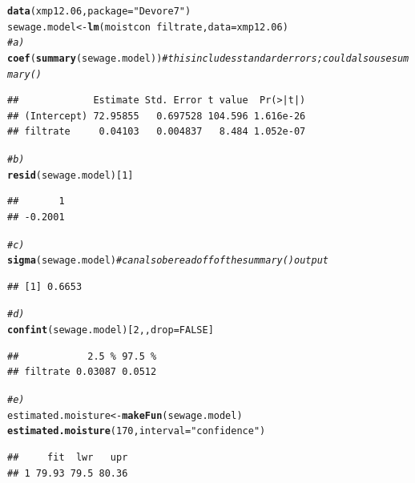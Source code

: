 \documentclass[twoside]{book}\usepackage[]{graphicx}\usepackage[]{xcolor}
\makeatletter
\newcommand{\hlnum}[1]{\textcolor[rgb]{0.686,0.059,0.569}{#1}}%
\newcommand{\hlstr}[1]{\textcolor[rgb]{0.192,0.494,0.8}{#1}}%
\newcommand{\hlcom}[1]{\textcolor[rgb]{0.678,0.584,0.686}{\textit{#1}}}%
\newcommand{\hlopt}[1]{\textcolor[rgb]{0,0,0}{#1}}%
\newcommand{\hlstd}[1]{\textcolor[rgb]{0.345,0.345,0.345}{#1}}%
\newcommand{\hlkwb}[1]{\textcolor[rgb]{0.69,0.353,0.396}{#1}}%
\newcommand{\hlkwc}[1]{\textcolor[rgb]{0.333,0.667,0.333}{#1}}%
\newcommand{\hlkwd}[1]{\textcolor[rgb]{0.737,0.353,0.396}{\textbf{#1}}}%
\newenvironment{kframe}{%
 \def\at@end@of@kframe{}%
 \ifinner\ifhmode%
  \def\at@end@of@kframe{\end{minipage}}%
  \begin{minipage}{\columnwidth}%
 \fi\fi%
 \def\FrameCommand##1{\hskip\@totalleftmargin \hskip-\fboxsep
 \colorbox{shadecolor}{##1}\hskip-\fboxsep
     \hskip-\linewidth \hskip-\@totalleftmargin \hskip\columnwidth}%
 \MakeFramed {\advance\hsize-\width
   \@totalleftmargin\z@ \linewidth\hsize
   \@setminipage}}%
 {\par\unskip\endMakeFramed%
 \at@end@of@kframe}
\newenvironment{knitrout}{}{} %
\makeatother
\begin{document}
\begin{solution}
\begin{knitrout}
\color{fgcolor}\begin{kframe}
\begin{alltt}
\hlkwd{data}\hlstd{(xmp12.06,} \hlkwc{package} \hlstd{=} \hlstr{"Devore7"}\hlstd{)}
\hlstd{sewage.model} \hlkwb{<-} \hlkwd{lm}\hlstd{(moistcon} \hlopt{~} \hlstd{filtrate,} \hlkwc{data} \hlstd{= xmp12.06)}
\hlcom{# a)}
\hlkwd{coef}\hlstd{(}\hlkwd{summary}\hlstd{(sewage.model))}  \hlcom{# this includes standard errors; could also use summary() }
\end{alltt}
\begin{verbatim}
##             Estimate Std. Error t value  Pr(>|t|)
## (Intercept) 72.95855   0.697528 104.596 1.616e-26
## filtrate     0.04103   0.004837   8.484 1.052e-07
\end{verbatim}
\begin{alltt}
\hlcom{# b)}
\hlkwd{resid}\hlstd{(sewage.model)[}\hlnum{1}\hlstd{]}
\end{alltt}
\begin{verbatim}
##       1 
## -0.2001
\end{verbatim}
\begin{alltt}
\hlcom{# c)}
\hlkwd{sigma}\hlstd{(sewage.model)}  \hlcom{# can also be read off of the summary() output}
\end{alltt}
\begin{verbatim}
## [1] 0.6653
\end{verbatim}
\begin{alltt}
\hlcom{# d)}
\hlkwd{confint}\hlstd{(sewage.model)[}\hlnum{2}\hlstd{, ,} \hlkwc{drop} \hlstd{=} \hlnum{FALSE}\hlstd{]}
\end{alltt}
\begin{verbatim}
##            2.5 % 97.5 %
## filtrate 0.03087 0.0512
\end{verbatim}
\begin{alltt}
\hlcom{# e) }
\hlstd{estimated.moisture} \hlkwb{<-} \hlkwd{makeFun}\hlstd{(sewage.model)}
\hlkwd{estimated.moisture}\hlstd{(}\hlnum{170}\hlstd{,} \hlkwc{interval} \hlstd{=} \hlstr{"confidence"}\hlstd{)}
\end{alltt}
\begin{verbatim}
##     fit  lwr   upr
## 1 79.93 79.5 80.36
\end{verbatim}
\end{kframe}
\end{knitrout}
\end{solution}
\end{document}
